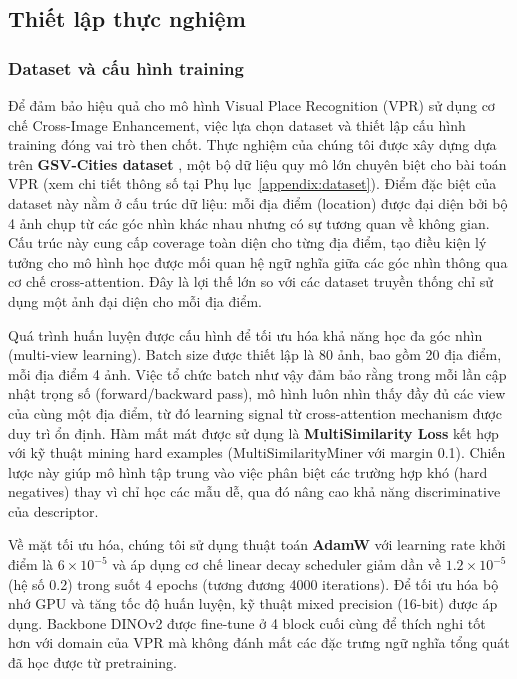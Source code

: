 \documentclass[12pt,a4paper]{article}
\begin{document}
    \subsection{Thiết lập thực nghiệm}

    \subsubsection{Dataset và cấu hình training}

    Để đảm bảo hiệu quả cho mô hình Visual Place Recognition (VPR) sử dụng cơ chế Cross-Image Enhancement, việc lựa chọn dataset và thiết lập cấu hình training đóng vai trò then chốt. Thực nghiệm của chúng tôi được xây dựng dựa trên \textbf{GSV-Cities dataset} \cite{alibey2022gsv}, một bộ dữ liệu quy mô lớn chuyên biệt cho bài toán VPR (xem chi tiết thông số tại Phụ lục~\ref{appendix:dataset}). Điểm đặc biệt của dataset này nằm ở cấu trúc dữ liệu: mỗi địa điểm (location) được đại diện bởi bộ 4 ảnh chụp từ các góc nhìn khác nhau nhưng có sự tương quan về không gian. Cấu trúc này cung cấp coverage toàn diện cho từng địa điểm, tạo điều kiện lý tưởng cho mô hình học được mối quan hệ ngữ nghĩa giữa các góc nhìn thông qua cơ chế cross-attention. Đây là lợi thế lớn so với các dataset truyền thống chỉ sử dụng một ảnh đại diện cho mỗi địa điểm.

    Quá trình huấn luyện được cấu hình để tối ưu hóa khả năng học đa góc nhìn (multi-view learning). Batch size được thiết lập là 80 ảnh, bao gồm 20 địa điểm, mỗi địa điểm 4 ảnh. Việc tổ chức batch như vậy đảm bảo rằng trong mỗi lần cập nhật trọng số (forward/backward pass), mô hình luôn nhìn thấy đầy đủ các view của cùng một địa điểm, từ đó learning signal từ cross-attention mechanism được duy trì ổn định. Hàm mất mát được sử dụng là \textbf{MultiSimilarity Loss} kết hợp với kỹ thuật mining hard examples (MultiSimilarityMiner với margin 0.1). Chiến lược này giúp mô hình tập trung vào việc phân biệt các trường hợp khó (hard negatives) thay vì chỉ học các mẫu dễ, qua đó nâng cao khả năng discriminative của descriptor.

    Về mặt tối ưu hóa, chúng tôi sử dụng thuật toán \textbf{AdamW} với learning rate khởi điểm là $6 \times 10^{-5}$ và áp dụng cơ chế linear decay scheduler giảm dần về $1.2 \times 10^{-5}$ (hệ số 0.2) trong suốt 4 epochs (tương đương 4000 iterations). Để tối ưu hóa bộ nhớ GPU và tăng tốc độ huấn luyện, kỹ thuật mixed precision (16-bit) được áp dụng. Backbone DINOv2 được fine-tune ở 4 block cuối cùng để thích nghi tốt hơn với domain của VPR mà không đánh mất các đặc trưng ngữ nghĩa tổng quát đã học được từ pretraining.
\end{document}
